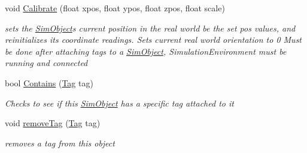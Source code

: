 \begin{DoxyCompactItemize}
void \hyperlink{class_pozyx_positioner_1_1_framework_1_1_sim_object_a7e07ca972f9fc7a962468f9746f9de72}{Calibrate} (float xpos, float ypos, float zpos, float scale)
\begin{DoxyCompactList}\small\item\em sets the \hyperlink{class_pozyx_positioner_1_1_framework_1_1_sim_object}{Sim\+Object}\textquotesingle{}s current position in the real world be the set pos values, and reinitializes its coordinate readings. Sets current real world orientation to 0 Must be done after attaching tags to a \hyperlink{class_pozyx_positioner_1_1_framework_1_1_sim_object}{Sim\+Object}, Simulation\+Environment must be running and connected \end{DoxyCompactList}\item 
bool \hyperlink{class_pozyx_positioner_1_1_framework_1_1_sim_object_a68a000516251ee3062ec72c22cc75f6d}{Contains} (\hyperlink{class_pozyx_positioner_1_1_framework_1_1_tag}{Tag} tag)
\begin{DoxyCompactList}\small\item\em Checks to see if this \hyperlink{class_pozyx_positioner_1_1_framework_1_1_sim_object}{Sim\+Object} has a specific tag attached to it \end{DoxyCompactList}\item 
void \hyperlink{class_pozyx_positioner_1_1_framework_1_1_sim_object_a7cbe138ef2d7a74045a2e706ae3f59b4}{remove\+Tag} (\hyperlink{class_pozyx_positioner_1_1_framework_1_1_tag}{Tag} tag)
\begin{DoxyCompactList}\small\item\em removes a tag from this object \end{DoxyCompactList}\end{DoxyCompactItemize}
